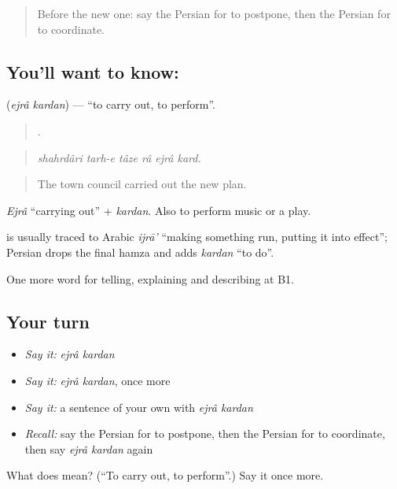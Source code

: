 \label{lesson:FA-C396-ejra-kardan}



\begin{quote}
Before the new one: say the Persian for to postpone, then the Persian for to coordinate.
\end{quote}

\subsection*{You'll want to know:  }
\textbf{ } (\emph{ejrâ kardan}) — \textquotedblleft{}to carry out, to perform\textquotedblright{}.

\begin{quote}
     .
\end{quote}

\begin{quote}
\emph{shahrdâri tarh-e tâze râ ejrâ kard.}
\end{quote}

\begin{quote}
The town council carried out the new plan.
\end{quote}

\emph{Ejrâ} \textquotedblleft{}carrying out\textquotedblright{} + \emph{kardan}. Also to perform music or a play.

\begin{cousinweb}
\textbf{} is usually traced to Arabic \emph{ijrā'} \textquotedblleft{}making something run, putting it into effect\textquotedblright{}; Persian drops the final hamza and adds \emph{kardan} \textquotedblleft{}to do\textquotedblright{}.
\end{cousinweb}

\begin{grammarlens}[title={What you've built}]
One more word for telling, explaining and describing at B1.
\end{grammarlens}

\subsection*{Your turn}
\begin{itemize}
\raggedright
  \item \emph{Say it:} \emph{ejrâ kardan}
  \item \emph{Say it:} \emph{ejrâ kardan}, once more
  \item \emph{Say it:} a sentence of your own with \emph{ejrâ kardan}
  \item \emph{Recall:} say the Persian for to postpone, then the Persian for to coordinate, then say \emph{ejrâ kardan} again
\end{itemize}

\begin{tcolorbox}[breakable,colback=teal!4,colframe=teal!35!black,title={Before you move on}]
What does   mean? (\textquotedblleft{}To carry out, to perform\textquotedblright{}.) Say it once more.
\end{tcolorbox}
